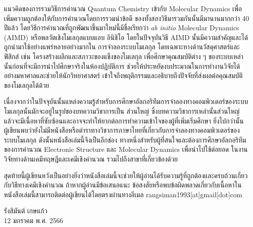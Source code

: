 {แนวคิดของการรวมวิธีการคำนวณ Quantum Chemistry เข้ากับ Molecular Dynamics เพื่อเพิ่มความถูกต้องให้กับการคำนวณโดยการรวมนำข้อดี%
ของทั้งสองวิธีมารวมกันนั้นมีมานานมากกว่า 40 ปีแล้ว โดยวิธีการคำนวณที่ถูกพัฒนาขึ้นมาใหม่นี้มีชื่อเรียกว่า \textit{ab initio} Molecular 
Dynamics (AIMD) หรือพลวัตเชิงโมเลกุลแบบแอบ อินิชิโอ โดยในปัจจุบันวิธี AIMD นั้นมีความสำคัญและได้ถูกนำมาใช้อย่างแพร่หลายอย่างมากใน%
การจำลองระบบโมเลกุล โดยเฉพาะทางด้านวัสดุศาสตร์และฟิสิกส์ เช่น โครงสร้างผลึกและสภาวะของแข็งของโมเลกุล เพื่อศึกษาคุณสมบัติต่าง ๆ 
ของระบบเหล่านั้นก่อนที่จะมีการนำไปศึกษาจริงในห้องปฏิบัติการ ช่วยให้ประหยัดงบประมาณในการทำงานวิจัยได้อย่างมหาศาลและช่วยให้นักวิทยาศาสตร์%
เข้าใจถึงพฤติกรรมและอธิบายถึงปัจจัยที่ส่งผลต่อคุณสมบัติของโมเลกุลได้ด้วย 

เนื่องจากว่าในปัจจุบันนั้นแหล่งความรู้สำหรับการศึกษาอัลกอริทึมการจำลองทางคอมพิวเตอร์ของระบบโมเลกุลนั้นมักจะอยู่ในรูปของบทความวิชาการเป็น%
ส่วนใหญ่ ซึ่งบทความวิชาการเหล่านั้นส่วนใหญ่แล้วจะมีเนื้อหาที่ซับซ้อนและอาจจะทำให้ยากต่อการทำความเข้าใจของผู้ที่เพิ่มเริ่มศึกษา ยิ่งไปกว่านั้น%
ผู้เขียนพบว่ายังไม่มีหนังสือหรือตำราทางวิชาการภาษาไทยที่เกี่ยวกับการจำลองทางคอมพิวเตอร์ของระบบโมเลกุล ดังนั้นหนังสือเล่มนี้จึงเป็นอีกช่อง%
ทางหนึ่งสำหรับผู้ที่สนใจและต้องการศึกษาอัลกอริทึมของการคำนวณ Electronic Structure และ Molecular Dynamics เพื่อนำไปใช้ต่อยอด%
ในงานวิจัยทางด้านเคมีทฤษฎีและเคมีเชิงคำนวณ รวมไปถึงสาขาที่เกี่ยวข้องด้วย

สุดท้ายนี้ผู้เขียนหวังเป็นอย่างยิ่งว่าหนังสือเล่มนี้จะช่วยให้ผู้อ่านได้รับความรู้ที่ถูกต้องและครบถ้วนเกี่ยวกับวิธีทางเคมีเชิงคำนวณ ถ้าหากผู้อ่านมีข้อเสนอแนะ 
ข้อสงสัยหรือพบข้อผิดพลาดเกี่ยวกับเนื้อหาในหนังสือเล่มนี้สามารถติดต่อผู้เขียนได้โดยตรงผ่านทางอีเมล rangsiman1993[at]gmail[dot]com

\medskip

\begin{flushright}
รังสิมันต์ เกษแก้ว \\
12 มกราคม พ.ศ. 2566
\end{flushright}
}
